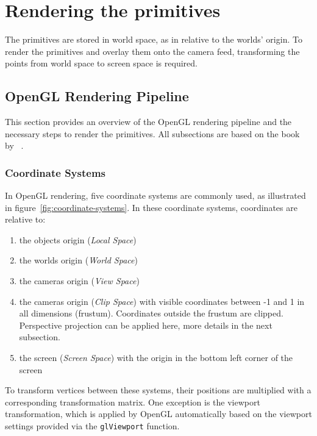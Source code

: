 \parencite{schnabel_efficient_2007}


\section{Rendering the primitives}\label{sec:rendering-the-primitives}
The primitives are stored in world space, as in relative to the worlds' origin.
To render the primitives and overlay them onto the camera feed,
transforming the points from world space to screen space is required.

\subsection{OpenGL Rendering Pipeline}
This section provides an overview of the OpenGL rendering pipeline and the necessary steps to render the primitives.
All subsections are based on the book~ by \citeauthor{de_vries_learn_2020}~\parencite{de_vries_learn_2020}.

\subsubsection{Coordinate Systems}\label{sec:coordinate-systems}
In OpenGL rendering, five coordinate systems are commonly used, as illustrated in figure~\ref{fig:coordinate-systems}.
In these coordinate systems, coordinates are relative to:
\begin{enumerate}
    \item the objects origin (\textit{Local Space})
    \item the worlds origin (\textit{World Space})
    \item the cameras origin (\textit{View Space})
    \item the cameras origin (\textit{Clip Space}) with visible coordinates between -1 and 1 in all dimensions (frustum).
    Coordinates outside the frustum are clipped.
    Perspective projection can be applied here, more details in the next subsection.
    \item the screen (\textit{Screen Space})  with the origin in the bottom left corner of the screen
\end{enumerate}
To transform vertices between these systems, their positions are multiplied with a corresponding transformation matrix.
One exception is the viewport transformation,
which is applied by OpenGL automatically based on the viewport settings provided via the \texttt{glViewport} function.

